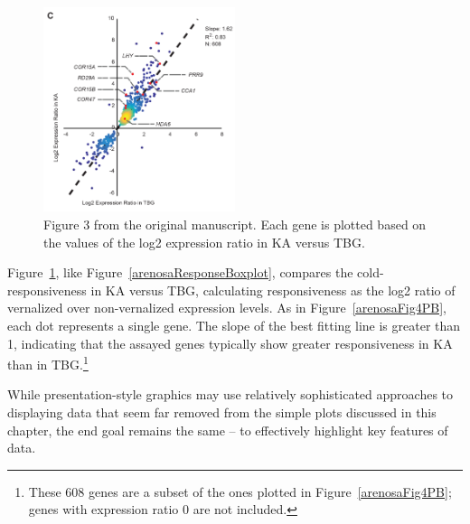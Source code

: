 \begin{figure}[h]
	\centering
	\includegraphics[width=0.5\textwidth]{ch_intro_to_data_oi_biostat/figures/arenosaVisFigs/Fig3_PB}
	\caption{Figure 3 from the original manuscript. Each gene is plotted based on the values of the log2 expression ratio in KA versus TBG.}
	\label{arenosaFig3PB}
\end{figure}

Figure~\ref{arenosaFig3PB}, like Figure~\ref{arenosaResponseBoxplot}, compares the cold-responsiveness in KA versus TBG, calculating responsiveness as the log2 ratio of vernalized over non-vernalized expression levels. As in Figure~\ref{arenosaFig4PB}, each dot represents a single gene. The slope of the best fitting line is greater than 1, indicating that the assayed genes typically show greater responsiveness in KA than in TBG.\footnote{These 608 genes are a subset of the ones plotted in Figure~\ref{arenosaFig4PB}; genes with expression ratio 0 are not included.}

While presentation-style graphics may use relatively sophisticated approaches to displaying data that seem far removed from the simple plots discussed in this chapter, the end goal remains the same -- to effectively highlight key features of data. 


